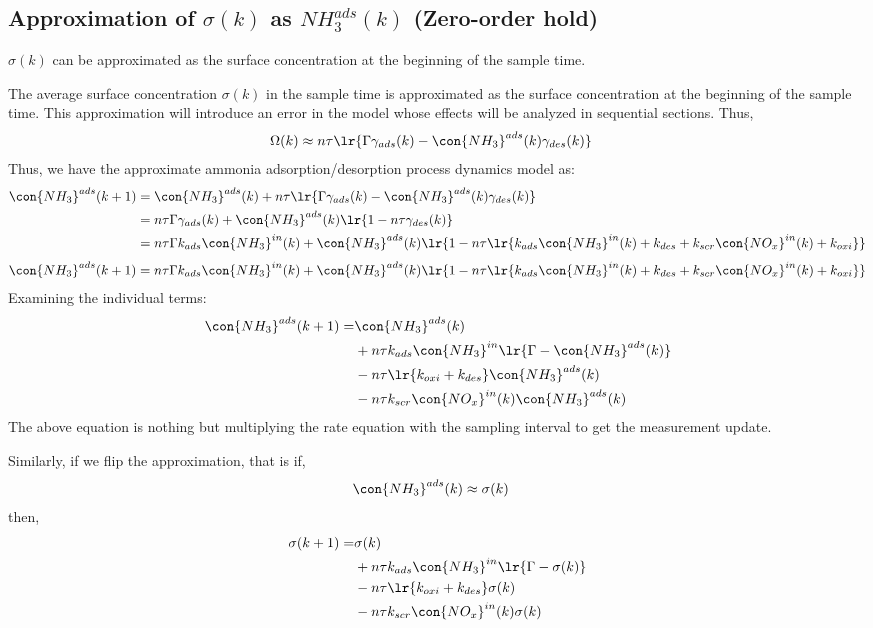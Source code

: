 \subsection{Approximation of $\sigma(k)$ as $NH_3^{ads}(k)$ (Zero-order hold)}
 $\sigma(k)$ can be approximated as the surface concentration at the beginning of the sample time.

The average surface concentration $\sigma(k)$ in the sample time is approximated as the surface concentration at the
beginning of the sample time. This approximation will introduce an error in the model whose effects will be analyzed in
sequential sections. Thus,
\begin{align}
    \Omega(k) &\approx n \tau \lr{\Gamma \gamma_{ads} (k) - \con{NH_3}^{ads}(k) \gamma_{des} (k)}
\end{align}
Thus, we have the approximate ammonia adsorption/desorption process dynamics model as:
\begin{align*}
    \con{NH_3}^{ads}(k + 1) &= \con{NH_3}^{ads} (k) + n \tau \lr{\Gamma \gamma_{ads} (k) - \con{NH_3}^{ads}(k) \gamma_{des} (k)}\\
    &= n \tau \Gamma \gamma_{ads} (k) + \con{NH_3}^{ads} (k) \lr{1 - n \tau \gamma_{des} (k)}\\
    &= n \tau \Gamma k_{ads} \con{NH_3}^{in}(k)  + \con{NH_3}^{ads} (k) \lr{1 - n \tau \lr{k_{ads} \con{NH_3}^{in}(k) + k_{des} + k_{scr} \con{NO_x}^{in}(k) + k_{oxi}}}
\end{align*}
\begin{multline}
    \con{NH_3}^{ads}(k + 1) = n \tau \Gamma k_{ads} \con{NH_3}^{in}(k)  + \con{NH_3}^{ads} (k) \lr{1 - n \tau \lr{k_{ads} \con{NH_3}^{in}(k) + k_{des} + k_{scr} \con{NO_x}^{in}(k) + k_{oxi}}}
\end{multline}
Examining the individual terms:
\begin{align*}
    \con{NH_3}^{ads}(k + 1) =& \con{NH_3}^{ads}(k)\\
        &+ n\tau k_{ads} \con{NH_3}^{in} \lr{\Gamma - \con{NH_3}^{ads}(k)} \\
        &- n \tau \lr{k_{oxi} + k_{des}} \con{NH_3}^{ads} (k)\\
        &- n \tau k_{scr} \con{NO_x}^{in}(k) \con{NH_3}^{ads}(k)
\end{align*}
The above equation is nothing but multiplying the rate equation with the sampling interval to get the measurement
update.

Similarly, if we flip the approximation, that is if,
\begin{align*}
    \con{NH_3}^{ads}(k) &\approx \sigma(k)
\end{align*}
then,
\begin{align*}
    \sigma(k + 1) =& \sigma(k)\\
        &+ n\tau k_{ads} \con{NH_3}^{in} \lr{\Gamma - \sigma(k)} \\
        &- n \tau \lr{k_{oxi} + k_{des}} \sigma(k)\\
        &- n \tau k_{scr} \con{NO_x}^{in}(k) \sigma(k)
\end{align*}
